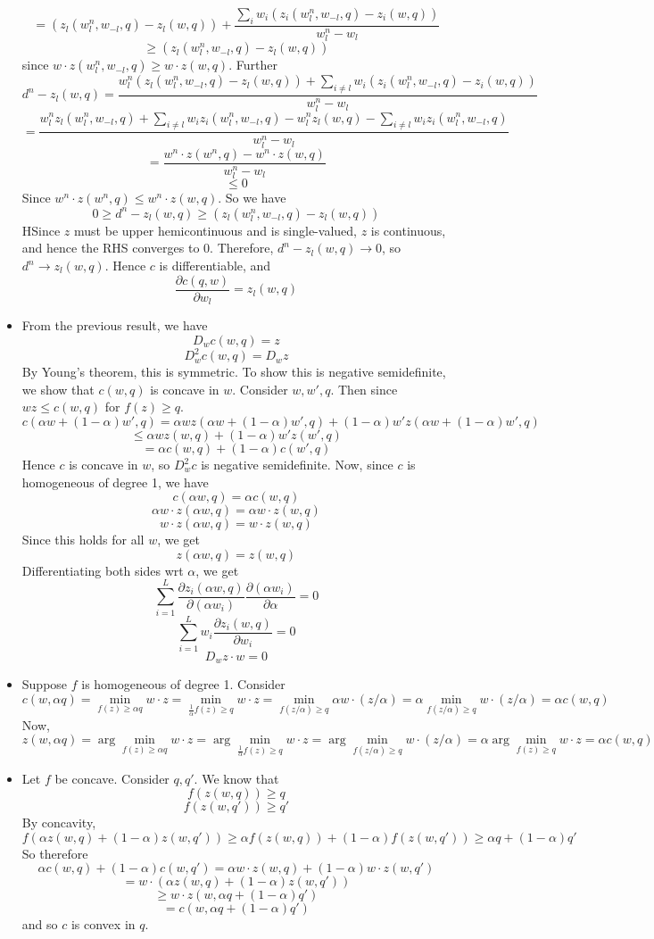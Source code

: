 \documentclass[10pt,letter]{article}
\begin{document}
\begin{itemize}
\[ = (z_l(w^n_l, w_{-l}, q)-  z_l(w, q)) + \frac{ \sum_{i} w_i (z_i(w^n_l, w_{-l}, q) - z_i(w, q))}{w^n_l - w_l} \]
\[ \ge (z_l(w^n_l, w_{-l}, q)-  z_l(w, q)) \]
since $w \cdot z(w^n_l, w_{-l}, q) \ge w \cdot z(w,q)$. Further
\[d^n - z_l(w,q) = \frac{w^n_l (z_l(w^n_l, w_{-l}, q)-  z_l(w, q)) + \sum_{i \neq l} w_i (z_i(w^n_l, w_{-l}, q) - z_i(w, q))}{w^n_l - w_l} \]
\[ =  \frac{w^n_lz_l(w^n_l, w_{-l}, q)+ \sum_{i \neq l} w_i z_i(w^n_l, w_{-l}, q)-  w^n_l z_l(w, q) - \sum_{i \neq l} w_i z_i(w^n_l, w_{-l}, q) }{w^n_l - w_l} \]
\[ = \frac{w^n \cdot z(w^n, q) - w^n \cdot z(w,q)}{w^n_l - w_l} \]
\[ \le 0 \]
Since $w^n \cdot z(w^n, q) \le w^n \cdot z(w,q)$. So we have
\[ 0 \ge d^n - z_l(w,q) \ge (z_l(w^n_l, w_{-l}, q)-  z_l(w, q)) \]
HSince $z$ must be upper hemicontinuous and is single-valued, $z$ is continuous, and hence the RHS converges to 0. Therefore, $d^n - z_l(w,q) \to 0$, so $d^n  \to z_l(w,q)$. Hence $c$ is differentiable, and
\[ \frac{\partial c(q, w)}{\partial w_l} = z_l(w,q) \]
\item From the previous result, we have
\[ D_w c(w,q) = z \]
\[ D_w^2 c(w,q) = D_wz \]
By Young's theorem, this is symmetric. To show this is negative semidefinite, we show that $c(w,q)$ is concave in $w$. Consider $w, w', q$. Then since $w z \le c(w,q)$ for $f(z) \ge q$.
\[ c(\alpha w + (1-\alpha)w', q) = \alpha w z(\alpha w + (1-\alpha)w', q) + (1-\alpha) w' z(\alpha w + (1-\alpha)w', q) \]
\[ \le \alpha w z(w, q) + (1-\alpha) w' z(w', q)  \]
\[ = \alpha c(w,q) + (1-\alpha)c(w', q) \]
Hence $c$ is concave in $w$, so $D^2_w c $ is negative semidefinite.
Now, since $c$ is homogeneous of degree 1, we have
\[ c(\alpha w, q) = \alpha c(w,q) \]
\[ \alpha w \cdot z(\alpha w, q) = \alpha w \cdot z(w,q)\]
\[ w \cdot z(\alpha w, q) = w \cdot z(w,q) \]
Since this holds for all $w$, we get
\[ z(\alpha w, q) = z(w,q) \]
Differentiating both sides wrt $\alpha$, we get
\[ \sum_{i=1}^L \frac{\partial z_i(\alpha w, q)}{\partial (\alpha w_i)} \frac{\partial (\alpha w_i)}{\partial \alpha} = 0\]
\[ \sum_{i=1}^L w_i \frac{\partial z_i(w, q)}{\partial w_i} = 0\]
\[ D_w z \cdot w = 0 \]
\item Suppose $f$ is homogeneous of degree 1. Consider
\[ c(w, \alpha q) = \min_{f(z) \ge \alpha q} w \cdot z = \min_{\frac{1}{\alpha}f(z) \ge q} w \cdot z = \min_{f(z/\alpha) \ge q} \alpha w \cdot (z/\alpha)= \alpha \min_{f(z/\alpha) \ge q} w \cdot (z/\alpha) = \alpha c(w,q) \]
Now,
\[ z(w, \alpha q) = \arg\min_{f(z) \ge \alpha q} w \cdot z = \arg\min_{\frac{1}{\alpha}f(z) \ge q} w \cdot z = \arg\min_{f(z/\alpha) \ge q} w \cdot (z/\alpha)= \alpha \arg\min_{f(z) \ge q} w \cdot z = \alpha c(w,q) \]
\item Let $f$ be concave. Consider $q, q'$. We know that
\[ f(z(w,q)) \ge q \]
\[ f(z(w,q')) \ge q' \]
By concavity,
\[ f(\alpha z(w,q) + (1-\alpha)z(w,q')) \ge \alpha f(z(w,q)) + (1-\alpha)f(z(w,q')) \ge \alpha q + (1-\alpha)q' \]
So therefore
\[ \alpha c(w,q) + (1-\alpha)c(w,q') = \alpha w \cdot z(w,q) + (1-\alpha) w \cdot z(w,q') \]
\[ = w \cdot (\alpha z(w,q) + (1-\alpha)z(w,q')) \]
\[ \ge w \cdot z(w, \alpha q + (1-\alpha) q') \]
\[ = c(w, \alpha q + (1-\alpha) q') \]
and so $c$ is convex in $q$.
\end{itemize}
\end{document}

